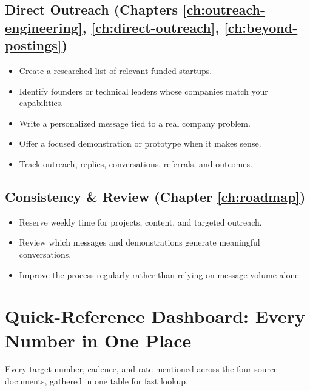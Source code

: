 \subsection{Direct Outreach (Chapters \ref{ch:outreach-engineering}, \ref{ch:direct-outreach}, \ref{ch:beyond-postings})}
\begin{itemize}[nosep]
  \item[$\square$] Create a researched list of relevant funded startups.
  \item[$\square$] Identify founders or technical leaders whose companies match your capabilities.
  \item[$\square$] Write a personalized message tied to a real company problem.
  \item[$\square$] Offer a focused demonstration or prototype when it makes sense.
  \item[$\square$] Track outreach, replies, conversations, referrals, and outcomes.
\end{itemize}

\subsection{Consistency \& Review (Chapter \ref{ch:roadmap})}
\begin{itemize}[nosep]
  \item[$\square$] Reserve weekly time for projects, content, and targeted outreach.
  \item[$\square$] Review which messages and demonstrations generate meaningful conversations.
  \item[$\square$] Improve the process regularly rather than relying on message volume alone.
\end{itemize}

\section{Quick-Reference Dashboard: Every Number in One Place}

Every target number, cadence, and rate mentioned across the four source documents, gathered in one table for fast
lookup.

